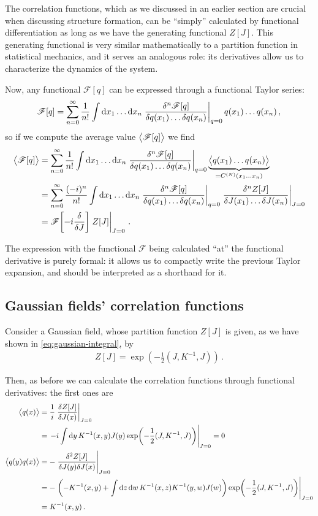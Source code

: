 \documentclass[main.tex]{subfiles}
\begin{document}
The correlation functions, which as we discussed in an earlier section are crucial when discussing structure formation, can be ``simply'' calculated by functional differentiation as long as we have the generating functional \(Z[J]\).
This generating functional is very similar mathematically to a partition function in statistical mechanics, and it serves an analogous role: its derivatives allow us to characterize the dynamics of the system. 

Now, any functional \(\mathscr{F} [q]\) can be expressed through a functional Taylor series:
%
\begin{align}
\mathscr{F}[q] = \sum _{n=0}^{\infty } \frac{1}{n!}
\int \dd{x_1} \dots \dd{x_n} \eval{\frac{ \delta^{n} \mathscr{F}[q]}{ \delta q(x_1) \dots \delta q(x_n)}}_{q = 0} q(x_1) \dots q(x_n)
\,,
\end{align}
%
so if we compute the average value \(\expval{\mathscr{F}[q]}\) we find 
%
\begin{align}
\expval{\mathscr{F}[q]} &= 
\sum _{n=0}^{\infty } \frac{1}{n!}
\int \dd{x_1} \dots \dd{x_n} \eval{\frac{ \delta^{n} \mathscr{F}[q]}{ \delta q(x_1) \dots \delta q(x_n)}}_{q = 0} \underbrace{\expval{q(x_1) \dots q(x_n)}}_{= C^{(N)} (x_1 \dots x_n)}  \\
&=\sum _{n=0}^{\infty } \frac{(-i)^{n}}{n!}
\int \dd{x_1} \dots \dd{x_n} \eval{\frac{ \delta^{n} \mathscr{F}[q]}{ \delta q(x_1) \dots \delta q(x_n)}}_{q = 0} 
\eval{\frac{ \delta^{n} Z[J]}{ \delta J(x_1 )\dots \delta J(x_n)}}_{J =0 } \\
&= \mathscr{F}\qty[ -i \fdv{}{J}]\eval{ Z[J]}_{J=0}
\,.
\end{align}

The expression with the functional \(\mathscr{F}\) being calculated ``at'' the functional derivative is purely formal: it allows us to compactly write the previous Taylor expansion, and should be interpreted as a shorthand for it.  

\subsection{Gaussian fields' correlation functions}

Consider a Gaussian field, whose partition function \(Z[J]\) is given, as we have shown in \eqref{eq:gaussian-integral}, by 
%
\begin{align}
Z[J] = \exp( - \frac{1}{2} (J, K^{-1}, J))
\,.
\end{align}

Then, as before we can calculate the correlation functions through functional derivatives: the first ones are 
%
\begin{align}
\expval{q(x)} &= \frac{1}{i} \eval{\fdv{Z[J]}{J(x)}}_{J=0}  \\
&= \eval{-i \int \dd{y} K^{-1}(x, y) J(y) \exp(- \frac{1}{2} (J, K^{-1}, J))}_{J =0} =0\\
\expval{q(y)q(x)} &= -\eval{\frac{ \delta^2 Z[J]}{ \delta  J(y) \delta  J (x)}}_{J=0} \\
&= -\eval{\qty(-K^{-1}(x, y) + \int \dd{z} \dd{w} K^{-1} (x, z)K^{-1} (y, w) J(w))\exp(- \frac{1}{2} (J, K^{-1}, J))}_{J =0}  \\
&= K^{-1} (x, y)
\,.
\end{align}
\end{document}
